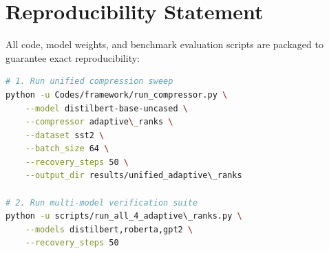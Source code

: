 \section{Reproducibility Statement}
All code, model weights, and benchmark evaluation scripts are packaged to guarantee exact reproducibility:
\begin{lstlisting}[language=bash]
# 1. Run unified compression sweep
python -u Codes/framework/run_compressor.py \
    --model distilbert-base-uncased \
    --compressor adaptive\_ranks \
    --dataset sst2 \
    --batch_size 64 \
    --recovery_steps 50 \
    --output_dir results/unified_adaptive\_ranks

# 2. Run multi-model verification suite
python -u scripts/run_all_4_adaptive\_ranks.py \
    --models distilbert,roberta,gpt2 \
    --recovery_steps 50
\end{lstlisting}
